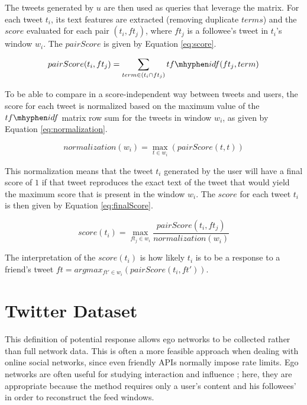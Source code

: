 The tweets generated by $u$ are then used as queries that leverage the matrix.  For each tweet $t_i$, its text features are extracted (removing duplicate $terms$) and the $score$ evaluated for each pair $(t_i,ft_j)$, where $ft_j$ is a followee's tweet in $t_i$'s window $w_i$. The $pairScore$ is given by Equation \ref{eq:score}.

\begin{equation}
pairScore(t_i,ft_j) = \sum_{term \in \left(t_i \cap ft_j\right)}{tf\mhyphen idf(ft_j,term)}
\label{eq:score}
\end{equation}

To be able to compare in a score-independent way between tweets and users, the score for each tweet is normalized based on the maximum value of the $tf\mhyphen idf$ matrix row sum for the tweets in window $w_i$, as given by Equation \ref{eq:normalization}.

\begin{equation}
normalization(w_i) = \max_{t \in w_i}(pairScore(t,t))
\label{eq:normalization}
\end{equation}

This normalization means that the tweet $t_i$ generated by the user will have a final score of $1$ if that tweet reproduces the exact text of the tweet that would yield the maximum score that is present in the window $w_i$. The $score$ for each tweet $t_i$ is then given by Equation \ref{eq:finalScore}.

\begin{equation}
score(t_i) =  \max_{ft_j \in w_i}\frac{pairScore(t_i,ft_j)}{normalization(w_i)}
\label{eq:finalScore}
\end{equation}

The interpretation of the $score(t_i)$ is how likely $t_i$ is to be a response to a friend's tweet $ft = argmax_{ft' \in w_i}(pairScore(t_i,ft'))$.


\section{Twitter Dataset}

This definition of potential response allows ego networks to be collected rather than full network data.  
This is often a more feasible approach when dealing with online social networks, since even friendly APIs normally impose rate limits.  
Ego networks are often useful for studying interaction and influence \cite{Welser2011,Sharma2013}; here, they are appropriate because the method requires only a user's content and his followees' in order to reconstruct the feed windows.

